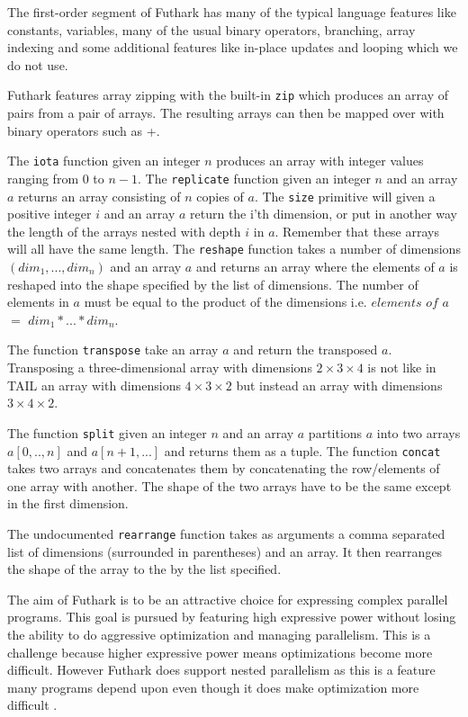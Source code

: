 \documentclass[11pt]{article}
\begin{document}
The first-order segment of Futhark has many of the typical language features like constants, variables, many of the usual binary operators, branching, array indexing and some additional features like in-place updates and looping which we do not use.

Futhark features array zipping with the built-in {\tt zip} which produces an array of pairs from a pair of arrays.
The resulting arrays can then be mapped over with binary operators such as +.

The {\tt iota} function given an integer $n$ produces an array with integer values ranging from 0 to $n-1$.
The {\tt replicate} function given an integer $n$ and an array $a$ returns an array consisting of $n$ copies of $a$.
The {\tt size} primitive will given a positive integer $i$ and an array $a$ return the i'th dimension, or put in another way
the length of the arrays nested with depth $i$ in $a$. Remember that these arrays will all have the same length.
The {\tt reshape} function takes a number of dimensions $(dim_1,..., dim_n)$ and an array $a$ and returns an array where the elements of $a$ is reshaped into the shape specified by the list of dimensions.
The number of elements in $a$ must be equal to the product of the dimensions i.e. $elements$ $of$ $a$ $=$ $dim_1 * ... * dim_n$.

The function {\tt transpose} take an array $a$ and return the transposed $a$.
Transposing a three-dimensional array with dimensions $2 \times 3 \times 4$ is not like in TAIL an array with dimensions $4\times3\times2$ but instead an array with dimensions $3\times4\times2$.

The function {\tt split} given an integer $n$ and an array $a$ partitions $a$ into two arrays $a[0,..,n]$ and $a[n+1,...]$ and returns them as a tuple. 
The function {\tt concat} takes two arrays and concatenates them by concatenating the row/elements of one array with another. The shape of the two arrays have to be the same except in the first dimension. 

The undocumented {\tt rearrange} function takes as arguments a comma separated list of dimensions (surrounded in parentheses) and an array. It then rearranges the shape of the array to the by the list specified.

The aim of Futhark is to be an attractive choice for expressing complex parallel programs.
This goal is pursued by featuring high expressive power without
losing the ability to do aggressive optimization and managing parallelism.
This is a challenge because higher expressive power means optimizations become more difficult. 
However Futhark does support nested parallelism as this is a feature many programs 
depend upon even though it does make optimization more difficult \cite{TroelsHenriksen}.
\end{document}
